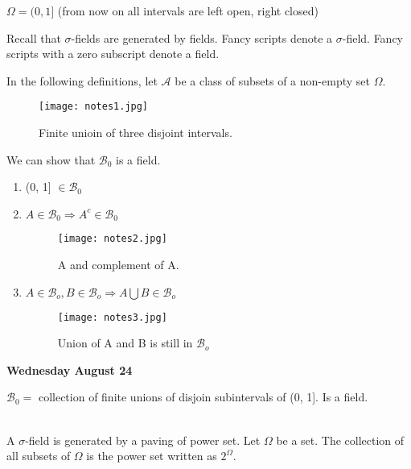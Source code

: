 \documentclass[11pt,fleqn]{book} %
\begin{document}
	\begin{example}
	$\Omega = (0, 1]$ (from now on all intervals are left open, right closed)\\

	\begin{remark}
		Recall that $\sigma$-fields are generated by fields. Fancy scripts denote a $\sigma$-field. Fancy scripts with a zero subscript denote a field.
	\end{remark}

	In the following definitions, let $\mathcal{A}$ be a class of subsets of a non-empty set $\Omega$.
	\begin{figure}[h]
	\centering\texttt{[image: notes1.jpg]}
	\caption{Finite unioin of three disjoint intervals.}
	\end{figure}

	We can show that $\mathcal{B}_0$ is a field. 

	\begin{enumerate}[label = (\roman*)]
		\item (0, 1] $\in \mathcal{B}_0$
		\item $A \in \mathcal{B}_0 \Rightarrow A^c \in \mathcal{B}_0$ 
		\begin{figure}[h]
		\centering\texttt{[image: notes2.jpg]}
		\caption{A and complement of A.}
		\end{figure}

		\item $A \in \mathcal{B}_o, B \in \mathcal{B}_o \Rightarrow A \bigcup B \in \mathcal{B}_o$ 

		\begin{figure}[h]
		\centering\texttt{[image: notes3.jpg]}
		\caption{Union of A and B is still in $\mathcal{B}_o$}
		\end{figure}

	\end{enumerate}


\end{example}


\textbf{Wednesday August 24}

$\mathcal{B}_0 = $ collection of finite unions of disjoin subintervals of (0, 1]. Is a field. \\
\\

\begin{definition}
	A $\sigma$-field is generated by a paving of power set. Let $\Omega$ be a set. The collection of all subsets of $\Omega$ is the power set written as $2^\Omega$.
\end{definition}
\end{document}

